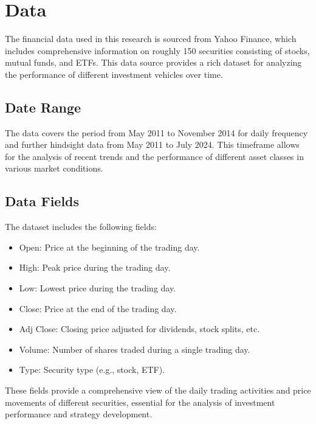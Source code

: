 \section{Data}
The financial data used in this research is sourced from Yahoo Finance, which includes comprehensive information on roughly 150 securities consisting of stocks, mutual funds, and ETFs. This data source provides a rich dataset for analyzing the performance of different investment vehicles over time.

\subsection{Date Range}
The data covers the period from May 2011 to November 2014 for daily frequency and further hindsight data from May 2011 to July 2024. This timeframe allows for the analysis of recent trends and the performance of different asset classes in various market conditions.

\subsection{Data Fields}
The dataset includes the following fields:
\begin{itemize}
    \item Open: Price at the beginning of the trading day.
    \item High: Peak price during the trading day.
    \item Low: Lowest price during the trading day.
    \item Close: Price at the end of the trading day.
    \item Adj Close: Closing price adjusted for dividends, stock splits, etc.
    \item Volume: Number of shares traded during a single trading day.
    \item Type: Security type (e.g., stock, ETF).
\end{itemize}

These fields provide a comprehensive view of the daily trading activities and price movements of different securities, essential for the analysis of investment performance and strategy development.

\newpage
